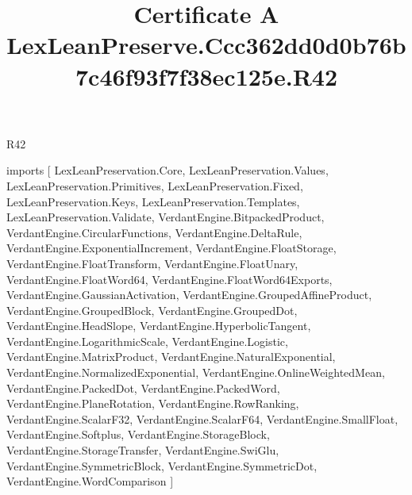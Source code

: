 \begin{lexlean}{R42}
\title{Certificate A LexLeanPreserve.Ccc362dd0d0b76b7c46f93f7f38ec125e.R42}
\begin{coremodule}
imports [
  LexLeanPreservation.Core,
  LexLeanPreservation.Values,
  LexLeanPreservation.Primitives,
  LexLeanPreservation.Fixed,
  LexLeanPreservation.Keys,
  LexLeanPreservation.Templates,
  LexLeanPreservation.Validate,
  VerdantEngine.BitpackedProduct,
  VerdantEngine.CircularFunctions,
  VerdantEngine.DeltaRule,
  VerdantEngine.ExponentialIncrement,
  VerdantEngine.FloatStorage,
  VerdantEngine.FloatTransform,
  VerdantEngine.FloatUnary,
  VerdantEngine.FloatWord64,
  VerdantEngine.FloatWord64Exports,
  VerdantEngine.GaussianActivation,
  VerdantEngine.GroupedAffineProduct,
  VerdantEngine.GroupedBlock,
  VerdantEngine.GroupedDot,
  VerdantEngine.HeadSlope,
  VerdantEngine.HyperbolicTangent,
  VerdantEngine.LogarithmicScale,
  VerdantEngine.Logistic,
  VerdantEngine.MatrixProduct,
  VerdantEngine.NaturalExponential,
  VerdantEngine.NormalizedExponential,
  VerdantEngine.OnlineWeightedMean,
  VerdantEngine.PackedDot,
  VerdantEngine.PackedWord,
  VerdantEngine.PlaneRotation,
  VerdantEngine.RowRanking,
  VerdantEngine.ScalarF32,
  VerdantEngine.ScalarF64,
  VerdantEngine.SmallFloat,
  VerdantEngine.Softplus,
  VerdantEngine.StorageBlock,
  VerdantEngine.StorageTransfer,
  VerdantEngine.SwiGlu,
  VerdantEngine.SymmetricBlock,
  VerdantEngine.SymmetricDot,
  VerdantEngine.WordComparison
]


\end{coremodule}
\end{lexlean}

